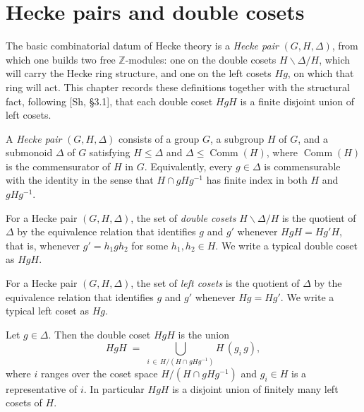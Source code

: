 \chapter{Hecke pairs and double cosets}\label{chap:hecke-pairs}

The basic combinatorial datum of Hecke theory is a \emph{Hecke pair} $(G,H,\Delta)$, from
which one builds two free $\mathbb{Z}$-modules: one on the double cosets
$H\backslash\Delta/H$, which will carry the Hecke ring structure, and one on the left
cosets $Hg$, on which that ring will act. This chapter records these definitions together
with the structural fact, following [Sh, \S3.1], that each double coset $HgH$ is a finite
disjoint union of left cosets.

\begin{definition}\label{def:hecke-pair}
\leanok
A \emph{Hecke pair} $(G,H,\Delta)$ consists of a group $G$, a subgroup $H$ of $G$, and a
submonoid $\Delta$ of $G$ satisfying $H\le\Delta$ and $\Delta\le\operatorname{Comm}(H)$,
where $\operatorname{Comm}(H)$ is the commensurator of $H$ in $G$. Equivalently, every
$g\in\Delta$ is commensurable with the identity in the sense that
$H\cap gHg^{-1}$ has finite index in both $H$ and $gHg^{-1}$.
\end{definition}

\begin{definition}\label{def:hecke-coset}
\leanok
For a Hecke pair $(G,H,\Delta)$, the set of \emph{double cosets} $H\backslash\Delta/H$ is
the quotient of $\Delta$ by the equivalence relation that identifies $g$ and $g'$ whenever
$HgH=Hg'H$, that is, whenever $g'=h_1 g h_2$ for some $h_1,h_2\in H$. We write a typical
double coset as $HgH$.
\end{definition}

\begin{definition}\label{def:hecke-left-coset}
\leanok
For a Hecke pair $(G,H,\Delta)$, the set of \emph{left cosets} is the quotient of $\Delta$
by the equivalence relation that identifies $g$ and $g'$ whenever $Hg=Hg'$. We write a
typical left coset as $Hg$.
\end{definition}

\begin{lemma}\label{lem:dc-eq-iUnion-lc}
\leanok
Let $g\in\Delta$. Then the double coset $HgH$ is the union
\[
  HgH \;=\; \bigcup_{i\,\in\, H/(H\cap gHg^{-1})} H\,(g_i\,g),
\]
where $i$ ranges over the coset space $H/(H\cap gHg^{-1})$ and $g_i\in H$ is a
representative of $i$. In particular $HgH$ is a disjoint union of finitely many left
cosets of $H$.
\end{lemma}

